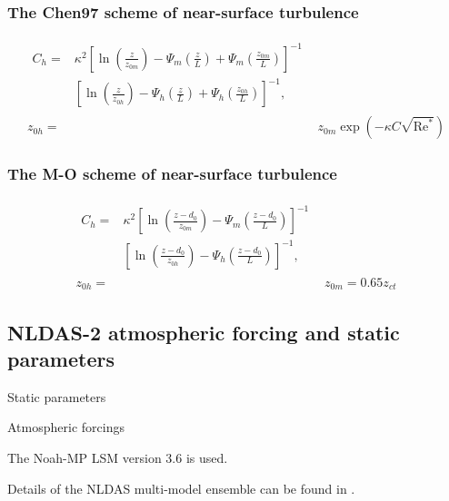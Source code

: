 \documentclass[essd]{copernicus}
\begin{document}
\subsubsection{The Chen97 scheme of near-surface turbulence}

\begin{align}
    \begin{split}
        C_h = & \kappa^2 \left[ \ln\left(\frac{z}{z_{0m}}\right)
            - \Psi_{m}\left(\frac{z}{L}\right)
            + \Psi_{m}\left(\frac{z_{0m}}{L}\right) \right]^{-1} \\
        & \left[ \ln\left(\frac{z}{z_{0h}}\right)
            - \Psi_{h}\left(\frac{z}{L}\right)
            + \Psi_{h}\left(\frac{z_{0h}}{L}\right) \right]^{-1} \text{,}
    \end{split}                                      \\
    z_{0h} = & z_{0m} \exp\left(-\kappa C \sqrt{\text{Re}^*}\right)
\end{align}


\subsubsection{The M-O scheme of near-surface turbulence}

\begin{align}
    \begin{split}
        C_h = & \kappa^2 \left[ \ln\left(\frac{z-d_0}{z_{0m}}\right)
            - \Psi_{m}\left(\frac{z-d_0}{L}\right) \right]^{-1} \\
        & \left[ \ln\left(\frac{z-d_0}{z_{0h}}\right)
            - \Psi_{h}\left(\frac{z-d_0}{L}\right) \right]^{-1}
        \text{,}
    \end{split}      \\
    z_{0h} = & z_{0m} = 0.65 z_{ct}
\end{align}


\subsection{NLDAS-2 atmospheric forcing and static parameters} \label{sec:data:nldas}

Static parameters

Atmospheric forcings

The Noah-MP LSM version 3.6 is used.

Details of the NLDAS multi-model ensemble can be found in \citet{xia2012JGRA,
xia2012JGRAa, fei2021WRR}.
\end{document}
